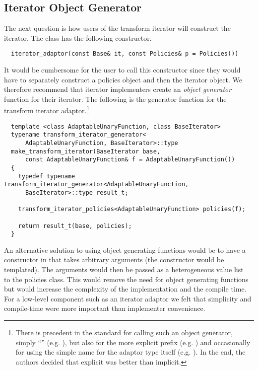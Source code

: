 \documentclass{netobjectdays}
\begin{document}

\subsection{Iterator Object Generator}
\label{sec:iter-object-generator}

The next question is how users of the transform iterator will
construct the iterator. The  class has the
following constructor.

{\footnotesize
\begin{verbatim}
  iterator_adaptor(const Base& it, const Policies& p = Policies())
\end{verbatim}
}

It would be cumbersome for the user to call this constructor since
they would have to separately construct a policies object and then the
iterator object. We therefore recommend that iterator implementers
create an \emph{object generator} function for their iterator. The
following is the generator function for the transform iterator
adaptor.\footnote{
    There is precedent in the standard for calling such
an object generator, simply ``''
(e.g. ), but also for the more explicit
 prefix (e.g. ) and occasionally
for using the simple name for the adaptor type itself
(e.g. ).  In the end, the authors decided
that explicit was better than implicit.  }

{\footnotesize
\begin{verbatim}
  template <class AdaptableUnaryFunction, class BaseIterator>
  typename transform_iterator_generator<
      AdaptableUnaryFunction, BaseIterator>::type
  make_transform_iterator(BaseIterator base,
      const AdaptableUnaryFunction& f = AdaptableUnaryFunction())
  {
    typedef typename transform_iterator_generator<AdaptableUnaryFunction,
      BaseIterator>::type result_t;

    transform_iterator_policies<AdaptableUnaryFunction> policies(f);

    return result_t(base, policies);
  }
\end{verbatim}
}

An alternative solution to using object generating functions would be
to have a constructor in  that takes arbitrary
arguments (the constructor would be templated). The arguments would
then be passed as a heterogeneous value list~\cite{TMPW00:Eisenecker}
to the policies class. This would remove the need for object
generating functions but would increase the complexity of the
implementation and the compile time. For a low-level component such as
an iterator adaptor we felt that simplicity and compile-time were more
important than implementer convenience.
\end{document}
